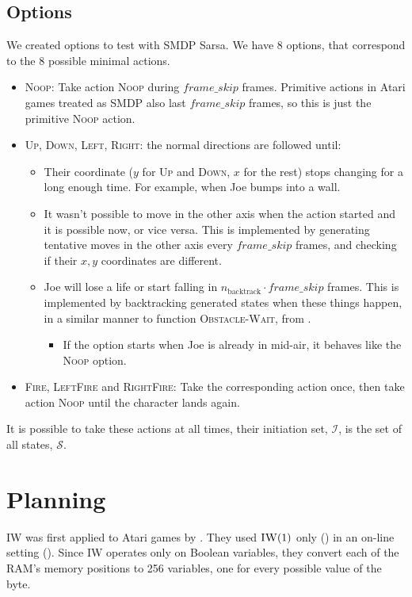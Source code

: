 \subsection{Options}
We created options to test with \ac{SMDP} Sarsa. We have 8 options, that
correspond to the 8 possible minimal actions.
\begin{itemize}
  \item \textsc{Noop}: Take action \textsc{Noop} during $frame\_skip$ frames.
    Primitive actions in Atari games treated as \ac{SMDP} also last
    $frame\_skip$ frames, so this is just the primitive \textsc{Noop} action.
  \item \textsc{Up}, \textsc{Down}, \textsc{Left}, \textsc{Right}: the normal
    directions are followed until:
    \begin{itemize}
      \item Their coordinate ($y$ for \textsc{Up} and \textsc{Down}, $x$ for the
        rest) stops changing for a long enough time. For example, when Joe bumps
into a wall.
      \item It wasn't possible to move in the other axis when the action started
        and it is possible now, or vice versa. This is implemented by generating
        tentative moves in the other axis every $frame\_skip$ frames, and
        checking if their $x,y$ coordinates are different.
      \item Joe will lose a life or start falling in $n_{\text{backtrack}} \cdot
        frame\_skip$ frames. This is implemented by backtracking generated
        states when these things happen, in a similar manner to function
        \textsc{Obstacle-Wait}, from .
        \begin{itemize}
          \item If the option starts when Joe is already in mid-air, it behaves
            like the \textsc{Noop} option.
        \end{itemize}
    \end{itemize}
  \item \textsc{Fire}, \textsc{LeftFire} and \textsc{RightFire}: Take the
    corresponding action once, then take action \textsc{Noop} until the
    character lands again.
\end{itemize}

It is possible to take these actions at all times, their initiation set,
$\mathcal{I}$, is the set of all states, $\mathcal{S}$.

\section{Planning}
\acl{IW} was first applied to Atari games by \citet{lipovetzky2015classical}.
They used $\textsc{IW}(1)$ only () in an on-line
setting (). Since \ac{IW} operates only on Boolean
variables, they convert each of the \ac{RAM}'s memory positions to 256
variables, one for every possible value of the byte.


